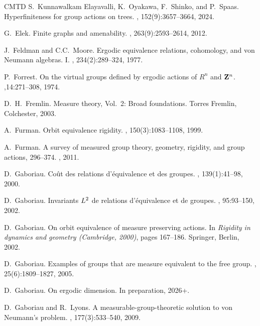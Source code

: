 \documentclass[11pt]{amsart}
\theoremstyle{definition}
\theoremstyle{plain}
\newcommand{\<}{\langle}
\renewcommand{\>}{\rangle}
\begin{document}
\begin{thebibliography}{CMTD}
S.~Kunnawalkam Elayavalli, K.~Oyakawa, F.~Shinko, and P.~Spaas.
\newblock Hyperfiniteness for group actions on trees.
, 152(9):3657--3664, 2024.

G.~Elek.
\newblock Finite graphs and amenability.
, 263(9):2593--2614, 2012.

J.~Feldman and C.C.~Moore.
\newblock Ergodic equivalence relations, cohomology, and von {N}eumann
  algebras. {I}.
, 234(2):289--324, 1977.

P.~Forrest.
\newblock On the virtual groups defined by ergodic actions of {$R^{n}$} and
  {${\bf Z}^{n}$}.
,14:271--308, 1974.

D.~H.~Fremlin.
\newblock Measure theory, {V}ol.\ 2: {B}road foundations.
\newblock Torres Fremlin, Colchester, 2003.

A.~Furman.
\newblock Orbit equivalence rigidity.
, 150(3):1083--1108, 1999.

A.~Furman.
\newblock A survey of measured group theory, geometry, rigidity, and group
  actions, 296--374.
,
  2011.

D.~Gaboriau.
\newblock Co\^ut des relations d'\'equivalence et des groupes.
, 139(1):41--98, 2000.

D.~Gaboriau.
\newblock Invariants {$L\sp 2$} de relations d'\'equivalence et de groupes.
, 95:93--150, 2002.

D.~Gaboriau.
\newblock On orbit equivalence of measure preserving actions.
\newblock In {\em Rigidity in dynamics and geometry (Cambridge, 2000)}, pages
  167--186. Springer, Berlin, 2002.

D.~Gaboriau.
\newblock Examples of groups that are measure equivalent to the free group.
, 25(6):1809--1827, 2005.

D.~Gaboriau.
\newblock On ergodic dimension.
\newblock In preparation, 2026+.

D.~Gaboriau and R.~Lyons.
\newblock A measurable-group-theoretic solution to von {N}eumann's problem.
, 177(3):533--540, 2009.


\end{thebibliography}
\end{document}
